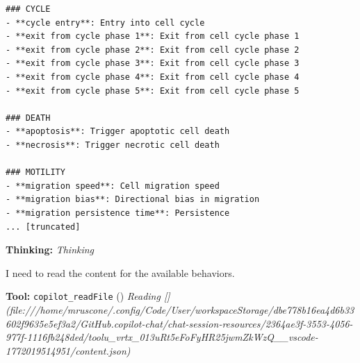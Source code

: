 \documentclass[11pt,a4paper]{article}
\begin{document}
\begin{toolokbox}
\begin{lstlisting}
### CYCLE
- **cycle entry**: Entry into cell cycle
- **exit from cycle phase 1**: Exit from cell cycle phase 1
- **exit from cycle phase 2**: Exit from cell cycle phase 2
- **exit from cycle phase 3**: Exit from cell cycle phase 3
- **exit from cycle phase 4**: Exit from cell cycle phase 4
- **exit from cycle phase 5**: Exit from cell cycle phase 5

### DEATH
- **apoptosis**: Trigger apoptotic cell death
- **necrosis**: Trigger necrotic cell death

### MOTILITY
- **migration speed**: Cell migration speed
- **migration bias**: Directional bias in migration
- **migration persistence time**: Persistence 
... [truncated]
\end{lstlisting}
\end{toolokbox}
\begin{thinkbox}
\textbf{Thinking:} \textit{Thinking}

I need to read the content for the available behaviors.

\end{thinkbox}
\begin{toolokbox}
\textbf{Tool:} \texttt{copilot\_readFile} (\checkmark)
\textit{Reading [](file:///home/mruscone/.config/Code/User/workspaceStorage/dbe778b16ea4d6b33602f9635e5ef3a2/GitHub.copilot-chat/chat-session-resources/2364ae3f-3553-4056-977f-1116fb248ded/toolu\_vrtx\_013uRt5eFoFyHR25jwmZkWzQ\_\_vscode-1772019514951/content.json)}
\end{toolokbox}
\end{document}
